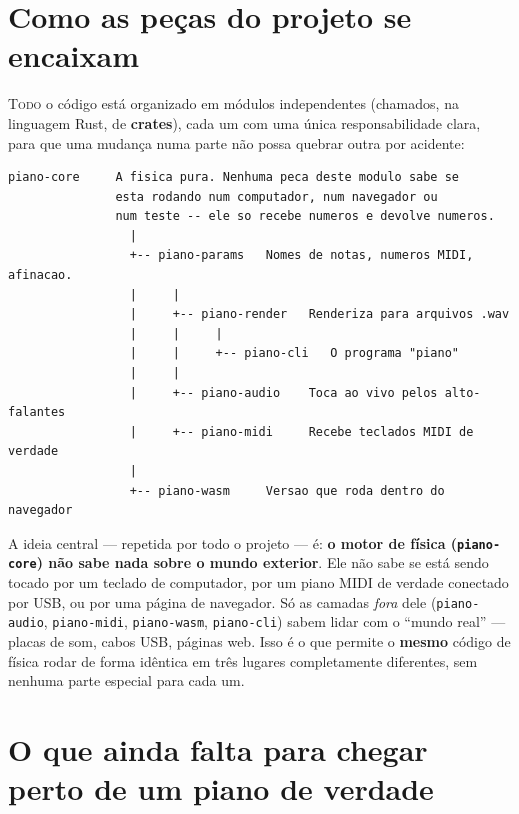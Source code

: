 \documentclass[11pt,oneside]{book}
\newcommand{\opening}[2]{\lettrine[lines=2,loversize=0.08,lraise=0.02]{#1}{#2}}
\begin{document}
\chapter{Como as peças do projeto se encaixam}

\opening{T}{odo} o código está organizado em módulos independentes
(chamados, na linguagem Rust, de \textbf{crates}), cada um com uma única
responsabilidade clara, para que uma mudança numa parte não possa quebrar
outra por acidente:

\begin{center}
\begin{tcolorbox}[colback=white,colframe=rulecol,boxrule=0.6pt,arc=0pt,
  left=10pt,right=10pt,top=8pt,bottom=8pt,width=0.92\linewidth]
\ttfamily\small
\begin{verbatim}
piano-core     A fisica pura. Nenhuma peca deste modulo sabe se
               esta rodando num computador, num navegador ou
               num teste -- ele so recebe numeros e devolve numeros.
                 |
                 +-- piano-params   Nomes de notas, numeros MIDI, afinacao.
                 |     |
                 |     +-- piano-render   Renderiza para arquivos .wav
                 |     |     |
                 |     |     +-- piano-cli   O programa "piano"
                 |     |
                 |     +-- piano-audio    Toca ao vivo pelos alto-falantes
                 |     +-- piano-midi     Recebe teclados MIDI de verdade
                 |
                 +-- piano-wasm     Versao que roda dentro do navegador
\end{verbatim}
\end{tcolorbox}
\end{center}

A ideia central --- repetida por todo o projeto --- é: \textbf{o motor de
física (\texttt{piano-core}) não sabe nada sobre o mundo exterior}. Ele não
sabe se está sendo tocado por um teclado de computador, por um piano MIDI
de verdade conectado por USB, ou por uma página de navegador. Só as
camadas \emph{fora} dele (\texttt{piano-audio}, \texttt{piano-midi},
\texttt{piano-wasm}, \texttt{piano-cli}) sabem lidar com o \enquote{mundo
real} --- placas de som, cabos USB, páginas web. Isso é o que permite o
\textbf{mesmo} código de física rodar de forma idêntica em três lugares
completamente diferentes, sem nenhuma parte especial para cada um.

\chapter{O que ainda falta para chegar perto de um piano de verdade}
\end{document}
